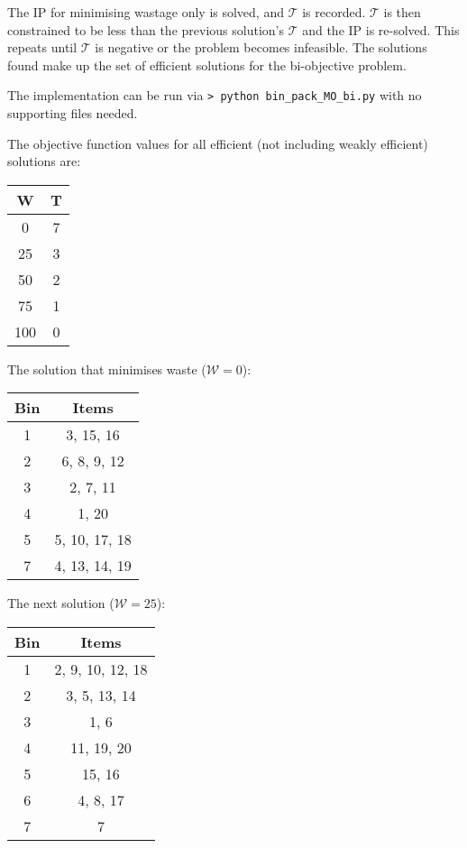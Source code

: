 \documentclass[10pt,a4paper]{article}
\begin{document}
\begin{enumerate}
The IP for minimising wastage only is solved, and \(\mathcal{T}\) is recorded. \(\mathcal{T}\) is then constrained to be less than the previous solution's \(\mathcal{T}\) and the IP is re-solved. This repeats until \(\mathcal{T}\) is negative or the problem becomes infeasible. The solutions found make up the set of efficient solutions for the bi-objective problem.

The implementation can be run via \lstinline|> python bin_pack_MO_bi.py| with no supporting files needed.

The objective function values for all efficient (not including weakly efficient) solutions are:
\begin{table}[H]
	\centering
\begin{tabular}{|c|c|}
	\hline 
	W & T \\ 
	\hline 
	0 & 7 \\ 
	\hline 
	25 & 3 \\ 
	\hline 
	50 & 2 \\ 
	\hline 
	75 & 1 \\ 
	\hline 
	100 & 0 \\ 
	\hline 
\end{tabular}
\end{table} 
The solution that minimises waste (\(\mathcal{W} = 0\)): 
\begin{table}[H]
\centering
\begin{tabular}{|c|c|}
	\hline 
	Bin & Items \\ 
	\hline 
	1 & 3, 15, 16 \\ 
	\hline 
	2 & 6, 8, 9, 12 \\ 
	\hline 
	3 & 2, 7, 11 \\ 
	\hline 
	4 & 1, 20 \\ 
	\hline 
	5 & 5, 10, 17, 18 \\ 
	\hline 
	7 & 4, 13, 14, 19\\ 
	\hline 
\end{tabular}
\end{table}
The next solution (\(\mathcal{W} = 25\)):
\begin{table}[H]
	\centering
\begin{tabular}{|c|c|}
	\hline 
	Bin & Items \\ 
	\hline 
	1 & 2, 9, 10, 12, 18 \\ 
	\hline 
	2 & 3, 5, 13, 14 \\ 
	\hline 
	3 & 1, 6 \\ 
	\hline 
	4 & 11, 19, 20 \\ 
	\hline 
	5 & 15, 16 \\ 
	\hline 
	6 & 4, 8, 17 \\ 
	\hline 
	7 & 7 \\ 
	\hline 
\end{tabular} 
\end{table}


\end{enumerate}
\end{document}
